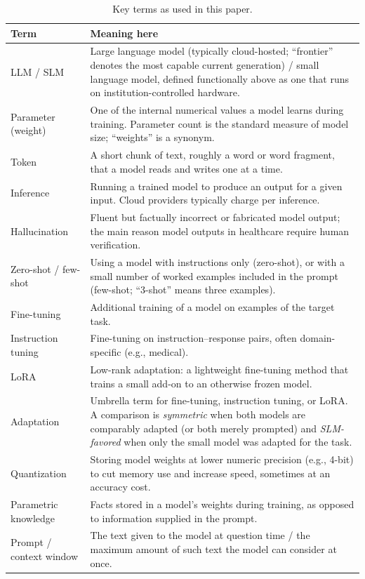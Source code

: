 \documentclass[11pt]{article}
\begin{document}
\begin{table}[ht]
\centering
\small
\caption{Key terms as used in this paper.}
\label{tab:glossary}
\begin{tabular}{@{}p{3.4cm}p{11.4cm}@{}}
\toprule
Term & Meaning here \\
\midrule
LLM / SLM & Large language model (typically cloud-hosted; ``frontier'' denotes the most capable current generation) / small language model, defined functionally above as one that runs on institution-controlled hardware. \\
Parameter (weight) & One of the internal numerical values a model learns during training. Parameter count is the standard measure of model size; ``weights'' is a synonym. \\
Token & A short chunk of text, roughly a word or word fragment, that a model reads and writes one at a time. \\
Inference & Running a trained model to produce an output for a given input. Cloud providers typically charge per inference. \\
Hallucination & Fluent but factually incorrect or fabricated model output; the main reason model outputs in healthcare require human verification. \\
Zero-shot / few-shot & Using a model with instructions only (zero-shot), or with a small number of worked examples included in the prompt (few-shot; ``3-shot'' means three examples). \\
Fine-tuning & Additional training of a model on examples of the target task. \\
Instruction tuning & Fine-tuning on instruction--response pairs, often domain-specific (e.g., medical). \\
LoRA & Low-rank adaptation: a lightweight fine-tuning method that trains a small add-on to an otherwise frozen model. \\
Adaptation & Umbrella term for fine-tuning, instruction tuning, or LoRA. A comparison is \emph{symmetric} when both models are comparably adapted (or both merely prompted) and \emph{SLM-favored} when only the small model was adapted for the task. \\
Quantization & Storing model weights at lower numeric precision (e.g., 4-bit) to cut memory use and increase speed, sometimes at an accuracy cost. \\
Parametric knowledge & Facts stored in a model's weights during training, as opposed to information supplied in the prompt. \\
Prompt / context window & The text given to the model at question time / the maximum amount of such text the model can consider at once. \\

\end{tabular}
\end{table}
\end{document}
